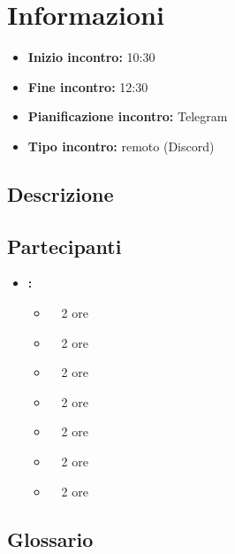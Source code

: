 \section{Informazioni}
\begin{itemize}
	\item \textbf{Inizio incontro:} 10:30
	\item \textbf{Fine incontro:} 12:30
	\item \textbf{Pianificazione incontro:} Telegram
	\item \textbf{Tipo incontro:} remoto (Discord)
\end{itemize}

\subsection{Descrizione}
\DocDescription

\subsection{Partecipanti}

\begin{itemize}
	\item \textbf{\GroupName:}
	\begin{itemize}
		\item \tommaso \ \rightarrow\ 2 ore
		\item \marco \ \rightarrow\ 2 ore
		\item \riccardo \ \rightarrow\ 2 ore
		\item \raul \ \rightarrow\ 2 ore
		\item \martina \ \rightarrow\ 2 ore
		\item \sebastiano \ \rightarrow\ 2 ore
		\item \mattia \ \rightarrow\ 2 ore
	\end{itemize}
\end{itemize}

\subsection{Glossario}
\GlossarioIntroduzione

\clearpage